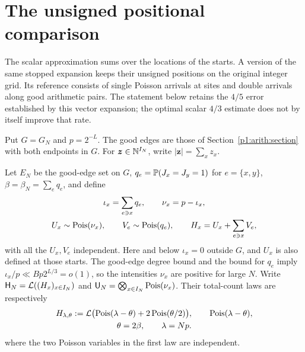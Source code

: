 \section{The unsigned positional comparison}
\label{p14:positions:section}

The scalar approximation sums over the locations of the starts. A version
of the same stopped expansion keeps their unsigned positions on the
original integer grid. Its reference consists of single Poisson arrivals
at sites and double arrivals along good arithmetic pairs. The statement
below retains the $4/5$ error established by this vector expansion; the
optimal scalar $4/3$ estimate does not by itself improve that rate.

Put $G=G_N$ and $p=2^{-L}$. The good edges are those of
Section~\ref{p1:arith:section} with both endpoints in $G$. For
$\boldsymbol z\in\N^{I_N}$, write $|\boldsymbol z|=\sum_xz_x$.

Let $E_N$ be the good-edge set on $G$,
$q_e=\P(J_x=J_y=1)$ for $e=\{x,y\}$,
$\beta=\beta_N=\sum_e q_e$, and define
\begin{equation}
 \begin{gathered}
 \iota_x=\sum_{e\ni x}q_e,\qquad \nu_x=p-\iota_x,\\
 U_x\sim\Pois(\nu_x),\qquad V_e\sim\Pois(q_e),\qquad
 H_x=U_x+\sum_{e\ni x}V_e,
 \end{gathered}
 \label{p1:limits:field-definition}
\end{equation}
with all the $U_x,V_e$ independent.  Here and below $\iota_x=0$
outside $G$, and $U_x$ is also defined at those starts.
The good-edge degree bound and the bound for $q_e$ imply
$\iota_x/p\ll Bp2^{L/3}=o(1)$, so the intensities $\nu_x$ are
positive for large $N$.  Write $\mathsf H_N=\Law((H_x)_{x\in I_N})$
and $\mathsf U_N=\bigotimes_{x\in I_N}\Pois(\nu_x)$.
Their total-count laws are respectively
\begin{equation}
 \begin{gathered}
 H_{\lambda,\theta}
   :=\Law\bigl(\Pois(\lambda-\theta)
                     +2\Pois(\theta/2)\bigr),\qquad
 \Pois(\lambda-\theta),\\
 \theta=2\beta,\qquad\lambda=Np.
 \end{gathered}
 \label{p1:limits:compound-target}
\end{equation}
where the two Poisson variables in the first law are independent.

